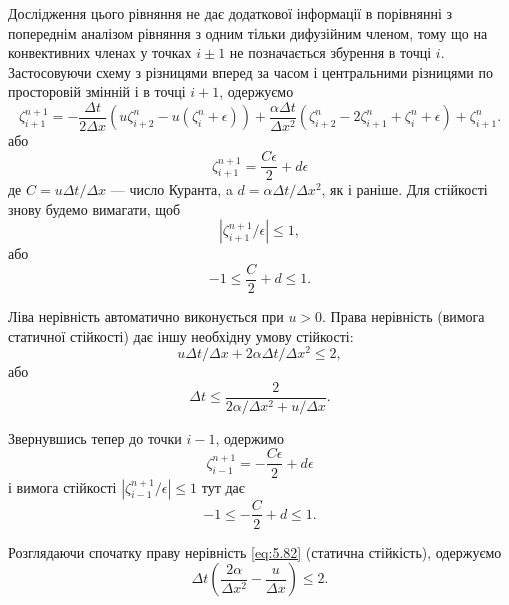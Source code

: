 Дослідження цього рівняння не дає додаткової інформації в порівнянні з попереднім аналізом рівняння з одним тільки дифузійним членом, тому що на конвективних членах у точках $i \pm 1$ не позначається збурення в точці $i$. Застосовуючи схему з різницями вперед за часом і центральними різницями по просторовій змінній і в точці $i + 1$, одержуємо
\begin{equation}
    \label{eq:5.76}
    \zeta_{i + 1}^{n + 1} = - \frac{\Delta t}{2 \Delta x} ( u \zeta_{i + 2}^n - u(\zeta_i^n + \epsilon)) + \frac{\alpha \Delta t}{\Delta x^2} (\zeta_{i + 2}^n - 2 \zeta_{i + 1}^n + \zeta_i^n + \epsilon) + \zeta_{i + 1}^n.
\end{equation}
або
\begin{equation}
    \label{eq:5.77}
    \zeta_{i + 1}^{n + 1} = \frac{C \epsilon}{2} + d \epsilon
\end{equation}
де $C = u \Delta t / \Delta x$ --- число Куранта, a $d = \alpha \Delta t / \Delta x^2$, як і раніше. Для стійкості знову будемо вимагати, щоб
\begin{equation}
    \label{eq:5.78}
    |\zeta_{i + 1}^{n + 1} / \epsilon| \le 1,
\end{equation}
або
\begin{equation}
    \label{eq:5.79}
    -1 \le \frac{C}{2} + d \le 1.
\end{equation}

Ліва нерівність автоматично виконується при $u > 0$. Права нерівність (вимога статичної стійкості) дає іншу необхідну умову стійкості:
\begin{equation}
    u \Delta t / \Delta x + 2 \alpha \Delta t / \Delta x^2 \le 2,
\end{equation}
або
\begin{equation}
    \label{eq:5.80}
    \Delta t \le \frac{2}{2 \alpha / \Delta x^2 + u / \Delta x}.    
\end{equation}

Звернувшись тепер до точки $i - 1$, одержимо
\begin{equation}
    \label{eq:5.81}
    \zeta_{i - 1}^{n + 1} = - \frac{C \epsilon}{2} + d \epsilon
\end{equation}
і вимога стійкості $|\zeta_{i - 1}^{n + 1} / \epsilon| \le 1$ тут дає
\begin{equation}
    \label{eq:5.82}
    -1 \le - \frac{C}{2} + d \le 1.
\end{equation}

Розглядаючи спочатку праву нерівність \eqref{eq:5.82} (статична стійкість), одержуємо
\begin{equation}
    \label{eq:5.83}
    \Delta t \left( \frac{2 \alpha}{\Delta x^2} - \frac{u}{\Delta x} \right) \le 2.    
\end{equation}

